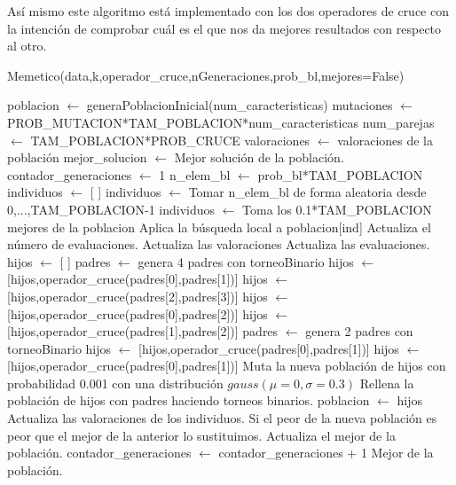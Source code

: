 \documentclass[12pt,a4paper]{article}
\begin{document}
	Así mismo este algoritmo está implementado con los dos operadores de cruce con la intención de comprobar cuál es el que nos da mejores resultados con respecto al otro.

	\begin{algorithm}
		\caption{Memetico(data,k,operador\_cruce,nGeneraciones,prob\_bl,mejores=False)}
		\begin{algorithmic}
			\STATE poblacion $\leftarrow$ generaPoblacionInicial(num\_caracteristicas)
			\STATE mutaciones $\leftarrow$ PROB\_MUTACION*TAM\_POBLACION*num\_caracteristicas
			\STATE num\_parejas $\leftarrow$ TAM\_POBLACION*PROB\_CRUCE
			\STATE valoraciones $\leftarrow$ valoraciones de la población
			\STATE mejor\_solucion $\leftarrow$ Mejor solución de la población.
			\STATE contador\_generaciones $\leftarrow$ 1
					\STATE n\_elem\_bl $\leftarrow$ prob\_bl*TAM\_POBLACION
					\STATE individuos $\leftarrow$ [ ]
						\STATE individuos $\leftarrow$ Tomar n\_elem\_bl de forma aleatoria desde 0,...,TAM\_POBLACION-1
					\ELSE
						\STATE individuos $\leftarrow$ Toma los 0.1*TAM\_POBLACION mejores de la poblacion
					\ENDIF
						\STATE Aplica la búsqueda local a poblacion[ind]
						\STATE Actualiza el número de evaluaciones.
					\ENDFOR
					\STATE Actualiza las valoraciones
					\STATE Actualiza las evaluaciones.
				\ENDIF
				\STATE
				\STATE hijos $\leftarrow$ [ ]
						\STATE padres $\leftarrow$ genera 4 padres con torneoBinario
						\STATE hijos $\leftarrow$ [hijos,operador\_cruce(padres[0],padres[1])]
						\STATE hijos $\leftarrow$ [hijos,operador\_cruce(padres[2],padres[3])]
						\STATE hijos $\leftarrow$ [hijos,operador\_cruce(padres[0],padres[2])]
						\STATE hijos $\leftarrow$ [hijos,operador\_cruce(padres[1],padres[2])]
					\ELSE
						\STATE padres $\leftarrow$ genera 2 padres con torneoBinario
						\STATE hijos $\leftarrow$ [hijos,operador\_cruce(padres[0],padres[1])]
						\STATE hijos $\leftarrow$ [hijos,operador\_cruce(padres[0],padres[1])]
					\ENDIF
				\ENDFOR
				\STATE Muta la nueva población de hijos con probabilidad 0.001 con una distribución $gauss(\mu=0,\sigma=0.3)$
				\STATE Rellena la población de hijos con padres haciendo torneos binarios.
				\STATE poblacion $\leftarrow$ hijos
				\STATE Actualiza las valoraciones de los individuos.
				\STATE Si el peor de la nueva población es peor que el mejor de la anterior lo sustituimos.
				\STATE Actualiza el mejor de la población.
				\STATE contador\_generaciones $\leftarrow$ contador\_generaciones + 1
			\ENDWHILE
			\RETURN Mejor de la población.
		\end{algorithmic}
	\end{algorithm}
\end{document}
